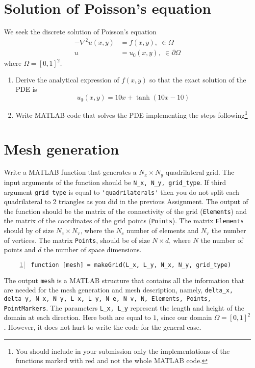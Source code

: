 \documentclass[unicode,11pt,a4paper,oneside,numbers=endperiod,openany]{scrartcl}
\begin{document}
\setassignment
{}


\section*{Solution of Poisson's equation}
We seek the discrete solution of Poisson's equation
\begin{align*}
-\nabla^2 u(x, y) &= f(x,y), \; \in \Omega \\
u                 &= u_0(x,y), \; \in \partial \Omega
\end{align*}
where $\Omega = [0,1]^2$.
\begin{enumerate}
\item Derive the analytical expression of $f(x,y)$ so that the exact 
solution of the PDE is \[u_0(x,y) =10 x + \tanh(10x - 10)\] 
\item Write {\small MATLAB} code that solves the PDE 
implementing the steps following\footnote{ 
You should include in your submission only the implementations of the
functions marked with red and not the whole \small{MATLAB} code.}
\end{enumerate}

\section{Mesh generation}
Write a \small{MATLAB} function that generates a $N_x \times N_y$ quadrilateral grid.
The input arguments of the function should be \lstinline+N_x, N_y, grid_type+. If third argument \lstinline+grid_type+
is equal to \lstinline+'quadrilaterals'+ then you do not split each quadrilateral
to 2 triangles as you did in the previous Assignment. 
The output of the function should be the matrix of the connectivity of the grid 
(\lstinline+Elements+) and the matrix of the coordinates of the grid points (\lstinline+Points+). 
The matrix \lstinline+Elements+ should by of size $N_e \times N_\text{v}$,
where the $N_e$ number of elements and $N_\text{v}$ the number of vertices. The matrix
\lstinline+Points+, should be of size $N \times d$, where $N$ the number of points and $d$ the number of 
space dimensions.
\begin{lstlisting}[numbers=left, numberstyle=\tiny, stepnumber=1, numbersep=10pt, identifierstyle=\ttfamily\color{Red}\bfseries]
function [mesh] = makeGrid(L_x, L_y, N_x, N_y, grid_type)
\end{lstlisting}
The output \lstinline+mesh+ is a MATLAB structure that contains all the information that are needed for the mesh generation
and mesh description, namely, \lstinline+delta_x, delta_y, N_x, N_y, L_x, L_y, N_e, N_v, N, Elements, Points, PointMarkers+. The parameters \lstinline+L_x, L_y+ represent the length and height of the domain at each direction. Here both are equal to $1$, since our domain $\Omega = [0, 1]^2$. However, it does not hurt to write the code for the general case. 
\end{document}
